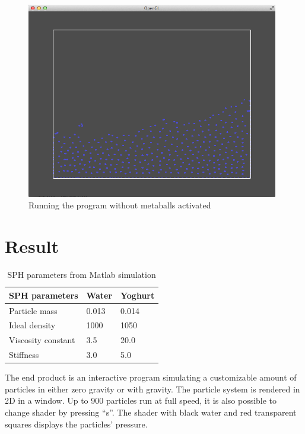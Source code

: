 \documentclass[a4paper,12pt,twoside,final]{report}
\begin{document}
\begin{figure}[H]
\begin{center}
    \includegraphics[width=11cm]{figs/image_2.png} 
\end{center}
\caption{Running the program without metaballs activated}
\label{model_block}
\end{figure}



\chapter{Result}

\begin{table}[h]
  \centering
  \caption{SPH parameters from Matlab simulation}
  \label{Matlab table}
    \begin{tabularx}{\textwidth}{| X | X | X |}
    \hline
    SPH parameters & Water & Yoghurt \\ \hline
    Particle mass & 0.013 & 0.014 \\ \hline
    Ideal density & 1000 & 1050 \\ \hline
    Viscosity constant & 3.5 & 20.0 \\ \hline
    Stiffness & 3.0 & 5.0 \\ \hline
    \end{tabularx}
\end{table}

\noindent The end product is an interactive program simulating a customizable amount of particles in either zero gravity or with gravity. The particle system is rendered in 2D in a window. Up to 900 particles run at full speed, it is also possible to change shader by pressing “s”. The shader with black water and red transparent squares displays the particles’ pressure. \\
\end{document}
